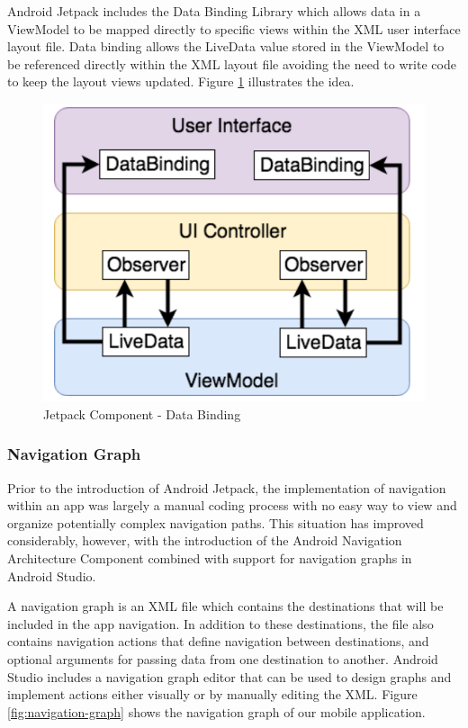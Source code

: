 Android Jetpack includes the Data Binding Library which allows data in a ViewModel to be mapped directly to specific views within the XML user interface layout file. Data binding allows the LiveData value stored in the ViewModel to be referenced directly within the XML layout file avoiding the need to write code to keep the layout views updated. Figure \ref{fig:data-binding} illustrates the idea.

\begin{figure}
    \centering
    \includegraphics[scale=0.5]{screenshots/data binding.png}
    \caption{Jetpack Component - Data Binding}
    \label{fig:data-binding}
\end{figure}

\subsubsection{Navigation Graph}
Prior to the introduction of Android Jetpack, the implementation of navigation within an app was largely a manual coding process with no easy way to view and organize potentially complex navigation paths. This situation has improved considerably, however, with the introduction of the Android Navigation Architecture Component combined with support for navigation graphs in Android Studio.

A navigation graph is an XML file which contains the destinations that will be included in the app navigation. In addition to these destinations, the file also contains navigation actions that define navigation between destinations, and optional arguments for passing data from one destination to another. Android Studio includes a navigation graph editor that can be used to design graphs and implement actions either visually or by manually editing the XML. Figure \ref{fig:navigation-graph} shows the navigation graph of our mobile application.


